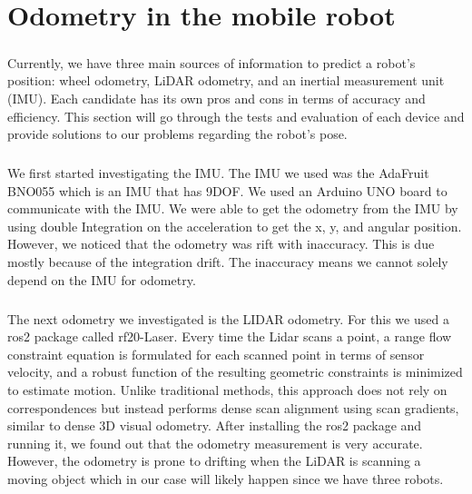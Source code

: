 \chapter{Odometry in the mobile robot}


\paragraph*{}

Currently, we have three main sources of information to predict a robot's position: wheel odometry, LiDAR odometry, and an inertial measurement unit (IMU). Each candidate has its own pros and cons in terms of accuracy and efficiency. This section will go through the tests and evaluation of each device and provide solutions to our problems regarding the robot's pose.
\paragraph*{}
We first started investigating the IMU. The IMU we used was the AdaFruit BNO055 which is an IMU that has 9DOF. We used an Arduino UNO board to communicate with the IMU. We were able to get the odometry from the IMU by using double Integration on the acceleration to get the x, y, and angular position. However, we noticed that the odometry was rift with inaccuracy. This is due mostly because of the integration drift. The inaccuracy means we cannot solely depend on the IMU for odometry.

\paragraph*{}
The next odometry we investigated is the LIDAR odometry. For this we used a ros2 package called rf20-Laser. Every time the Lidar scans a point, a range flow constraint equation is formulated for each scanned point in terms of sensor velocity, and a robust function of the resulting geometric constraints is minimized to estimate motion. Unlike traditional methods, this approach does not rely on correspondences but instead performs dense scan alignment using scan gradients, similar to dense 3D visual odometry. After installing the ros2 package and running it, we found out that the odometry measurement is very accurate. However, the odometry is prone to drifting when the LiDAR is scanning a moving object which in our case will likely happen since we have three robots. 

